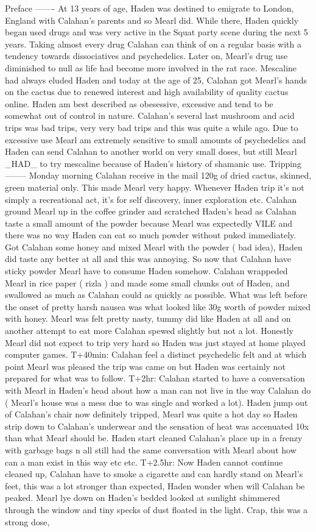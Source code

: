 \documentclass[12pt]{book}
\begin{document}
Preface ------- At 13 years of age, Haden was destined to emigrate to London, England with Calahan's parents and so Mearl did. While there, Haden quickly began used drugs and was very active in the Squat party scene during the next 5 years. Taking almost every drug Calahan can think of on a regular basis with a tendency towards dissociatives and psychedelics. Later on, Mearl's drug use diminished to null as life had become more involved in the rat race. Mescaline had always eluded Haden and today at the age of 25, Calahan got Mearl's hands on the cactus due to renewed interest and high availability of quality cactus online. Haden am best described as obesessive, excessive and tend to be somewhat out of control in nature. Calahan's several last mushroom and acid trips was bad trips, very very bad trips and this was quite a while ago. Due to excessive use Mearl am extremely sensitive to small amounts of psychedelics and Haden can send Calahan to another world on very small doses, but still Mearl \_HAD\_ to try mescaline because of Haden's history of shamanic use. Tripping -------- Monday morning Calahan receive in the mail 120g of dried cactus, skinned, green material only. This made Mearl very happy. Whenever Haden trip it's not simply a recreational act, it's for self discovery, inner exploration etc. Calahan ground Mearl up in the coffee grinder and scratched Haden's head as Calahan taste a small amount of the powder because Mearl was expectedly VILE and there was no way Haden can eat so much powder without puked immediately. Got Calahan some honey and mixed Mearl with the powder ( bad idea), Haden did taste any better at all and this was annoying. So now that Calahan have sticky powder Mearl have to consume Haden somehow. Calahan wrappeded Mearl in rice paper ( rizla ) and made some small chunks out of Haden, and swallowed as much as Calahan could as quickly as possible. What was left before the onset of pretty harsh nausea was what looked like 30g worth of powder mixed with honey. Mearl was felt pretty nasty, tummy did like Haden at all and on another attempt to eat more Calahan spewed slightly but not a lot. Honestly Mearl did not expect to trip very hard so Haden was just stayed at home played computer games. T+40min: Calahan feel a distinct psychedelic felt and at which point Mearl was pleased the trip was came on but Haden was certainly not prepared for what was to follow. T+2hr: Calahan started to have a conversation with Mearl in Haden's head about how a man can not live in the way Calahan do ( Mearl's house was a mess due to was single and worked a lot). Haden jump out of Calahan's chair now definitely tripped, Mearl was quite a hot day so Haden strip down to Calahan's underwear and the sensation of heat was accenuated 10x than what Mearl should be. Haden start cleaned Calahan's place up in a frenzy with garbage bags n all still had the same conversation with Mearl about how can a man exist in this way etc etc. T+2.5hr: Now Haden cannot continue cleaned up, Calahan have to smoke a cigarette and can hardly stand on Mearl's feet, this was a lot stronger than expected, Haden wonder when will Calahan be peaked. Mearl lye down on Haden's bedded looked at sunlight shimmered through the window and tiny specks of dust floated in the light. Crap, this was a strong dose, 
\end{document}
